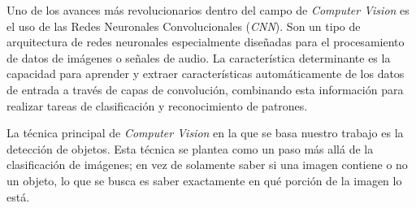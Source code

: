 \documentclass[a4paper]{article}
\begin{document}
Uno de los avances más revolucionarios dentro del campo de \textit{Computer Vision} es el uso de las Redes Neuronales Convolucionales (\textit{CNN}). Son un tipo de arquitectura de redes neuronales especialmente diseñadas para el procesamiento de datos de imágenes o señales de audio. La característica determinante es la capacidad para aprender y extraer características automáticamente de los datos de entrada a través de capas de convolución, combinando esta información para realizar tareas de clasificación y reconocimiento de patrones.

La técnica principal de \textit{Computer Vision} en la que se basa nuestro trabajo es la detección de objetos. Esta técnica se plantea como un paso más allá de la clasificación de imágenes; en vez de solamente saber si una imagen contiene o no un objeto, lo que se busca es saber exactamente en qué porción de la imagen lo está.

\begin{figure}[H]
\end{figure}
\end{document}
